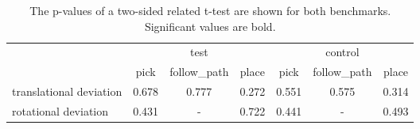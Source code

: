 \documentclass[a4paper]{article}
\begin{document}
\begin{table}[]
\begin{tabular}{lclllll}
		\multicolumn{1}{c|}{ }  &\multicolumn{3}{c|}{test}                                                                                                      & \multicolumn{3}{c|}{control}                                                                                                   \\ \cline{2-7} 
		\multicolumn{1}{c|}{}  & \multicolumn{1}{c|}{ pick} & \multicolumn{1}{c|}{follow\_path} & \multicolumn{1}{c|}{ place} & \multicolumn{1}{c|}{pick} & \multicolumn{1}{c|}{follow\_path} & \multicolumn{1}{c|}{ place} \\ \hline
		\multicolumn{1}{|l|}{translational deviation} & \multicolumn{1}{l|}{0.678}                       & \multicolumn{1}{c|}{0.777}                     & \multicolumn{1}{l|}{0.272}                        & \multicolumn{1}{l|}{0.551}                       & \multicolumn{1}{c|}{0.575}                     & \multicolumn{1}{l|}{0.314}                        \\ \hline
		\multicolumn{1}{|l|}{rotational deviation}    & \multicolumn{1}{l|}{0.431}                       & \multicolumn{1}{c|}{-}                         & \multicolumn{1}{l|}{0.722}                        & \multicolumn{1}{l|}{0.441}                       & \multicolumn{1}{c|}{-}                         & \multicolumn{1}{l|}{0.493}                        \\ \hline
	\end{tabular}
\caption{ The p-values of a two-sided related t-test are shown for both benchmarks. Significant values are bold. }
\end{table}
\end{document}
